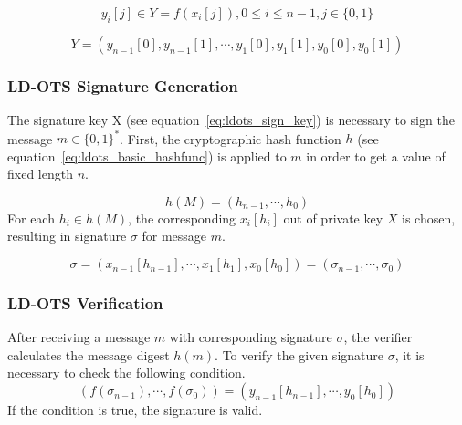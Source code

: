 \begin{equation}
y_i[j] \in Y = f(x_i[j]), 0 \leq i \leq n-1, j \in \lbrace 0,1 \rbrace
\end{equation}

\begin{equation}
Y = \left( 
y_{n-1}\left[0\right], y_{n-1}\left[1 \right], \cdots, y_{1}\left[0\right], y_{1}\left[1\right], y_{0}\left[0\right], y_{0}\left[1\right]
\right)
\end{equation}

\subsubsection{LD-OTS Signature Generation} %
The signature key X (see equation~\ref{eq:ldots_sign_key}) is necessary to sign the message $m \in \lbrace 0,1 \rbrace^*$. 
First, the cryptographic hash function $h$ (see equation~\ref{eq:ldots_basic_hashfunc}) is applied to $m$ in order to get a value of fixed length $n$.

\begin{equation}
\label{eq:ldots_hash_message}
h(M)=(h_{n-1}, \cdots, h_{0})
\end{equation}
For each $h_i \in h(M)$, the corresponding $x_i[h_i]$ out of private key $X$ is chosen, resulting in signature $\sigma$ for message $m$.

\begin{equation}
\sigma = \left(
x_{n-1} \left[ h_{n-1} \right], \cdots, x_1\left[ h_1 \right], x_0\left[ h_0\right]
\right) = (\sigma_{n-1}, \cdots, \sigma_0)
\end{equation}

\subsubsection{LD-OTS Verification}
After receiving a message $m$ with corresponding signature $\sigma$, the verifier calculates the message digest $h(m)$. 
To verify the given signature $\sigma$, it is necessary to check the following condition.
\begin{equation}
\left(
f(\sigma_{n-1}), \cdots, f(\sigma_0)
\right) =
\left(
y_{n-1}[h_{n-1}], \cdots, y_0[h_0]
\right)
\end{equation}
If the condition is true, the signature is valid.


